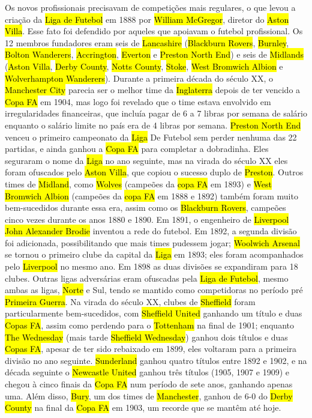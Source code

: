\documentclass[a4paper,12pt]{article}
\begin{document}
Os novos profissionais precisavam de competições mais regulares, o que levou a criação da \hl{Liga de Futebol} em 1888 por \hl{William McGregor}, diretor do \hl{Aston Villa}. Esse fato foi defendido por aqueles que apoiavam o futebol profissional. Os 12 membros fundadores eram seis de \hl{Lancashire} (\hl{Blackburn Rovers}, \hl{Burnley}, \hl{Bolton Wanderers}, \hl{Accrington}, \hl{Everton} e \hl{Preston North End}) e seis de \hl{Midlands} (\hl{Aston Villa}, \hl{Derby County}, \hl{Notts County}, \hl{Stoke}, \hl{West Bromwich Albion} e \hl{Wolverhampton Wanderers}). Durante a primeira década do século XX, o \hl{Manchester City} parecia ser o melhor time da \hl{Inglaterra} depois de ter vencido a \hl{Copa FA} em 1904, mas logo foi revelado que o time estava envolvido em irregularidades financeiras, que incluía pagar de 6 a 7 libras por semana de salário enquanto o salário limite no país era de 4 libras por semana.
\hl{Preston North End} venceu o primeiro campeonato da \hl{Liga} De Futebol sem perder nenhuma das 22 partidas, e ainda ganhou a \hl{Copa FA} para completar a dobradinha. Eles seguraram o nome da \hl{Liga} no ano seguinte, mas na virada do século XX eles foram ofuscados pelo \hl{Aston Villa}, que copiou o sucesso duplo de \hl{Preston}. Outros times de \hl{Midland}, como \hl{Wolves} (campeões da \hl{copa FA} em 1893) e \hl{West Bromwich Albion} (campeões da \hl{copa FA} em 1888 e 1892) também foram muito bem-sucedidos durante essa era, assim como os \hl{Blackburn Rovers}, campeões cinco vezes durante os anos 1880 e 1890.
Em 1891, o engenheiro de \hl{Liverpool} \hl{John Alexander Brodie} inventou a rede do futebol.
Em 1892, a segunda divisão foi adicionada, possibilitando que mais times pudessem jogar; \hl{Woolwich Arsenal} se tornou o primeiro clube da capital da \hl{Liga} em 1893; eles foram acompanhados pelo \hl{Liverpool} no mesmo ano. Em 1898 as duas divisões se expandiram para 18 clubes. Outras ligas adversárias eram ofuscadas pela \hl{Liga de Futebol}, mesmo ambas as ligas, \hl{Norte} e Sul, tendo se mantido como competidoras no período pré \hl{Primeira Guerra}.
Na virada do século XX, clubes de \hl{Sheffield} foram particularmente bem-sucedidos, com \hl{Sheffield United} ganhando um título e duas \hl{Copas FA}, assim como perdendo para o \hl{Tottenham} na final de 1901; enquanto \hl{The Wednesday} (mais tarde \hl{Sheffield Wednesday}) ganhou dois títulos e duas \hl{Copas FA}, apesar de ter sido rebaixado em 1899, eles voltaram para a primeira divisão no ano seguinte. \hl{Sunderland} ganhou quatro títulos entre 1892 e 1902, e na década seguinte o \hl{Newcastle United} ganhou três títulos (1905, 1907 e 1909) e chegou à cinco finais da \hl{Copa FA} num período de sete anos, ganhando apenas uma. Além disso, \hl{Bury}, um dos times de \hl{Manchester}, ganhou de 6-0 do \hl{Derby County} na final da \hl{Copa FA} em 1903, um recorde que se mantêm até hoje.
\end{document}
